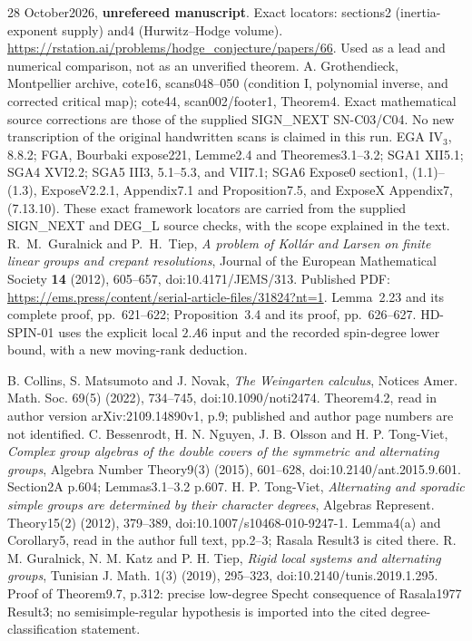28 October2026, \textbf{unrefereed manuscript}.
Exact locators: sections2 (inertia-exponent supply) and4
(Hurwitz--Hodge volume). \url{https://rstation.ai/problems/hodge_conjecture/papers/66}.
Used as a lead and numerical comparison, not as an unverified theorem.
A. Grothendieck, Montpellier archive, cote16, scans048--050
(condition I, polynomial inverse, and corrected critical map);
cote44, scan002/footer1, Theorem4. Exact mathematical source corrections
are those of the supplied SIGN\_NEXT SN-C03/C04. No new transcription
of the original handwritten scans is claimed in this run.
EGA IV$_3$, 8.8.2; FGA, Bourbaki expose221, Lemme2.4 and
Theoremes3.1--3.2; SGA1 XII5.1; SGA4 XVI2.2;
SGA5 III3, 5.1--5.3, and VII7.1;
SGA6 Expose0 section1, (1.1)--(1.3), ExposeV2.2.1,
Appendix7.1 and Proposition7.5, and ExposeX Appendix7, (7.13.10).
These exact framework locators are carried from the supplied
SIGN\_NEXT and DEG\_L source checks, with the scope explained in the text.
R.~M.~Guralnick and P.~H.~Tiep,
\emph{A problem of Koll\'ar and Larsen on finite linear groups
and crepant resolutions},
Journal of the European Mathematical Society \textbf{14}
(2012), 605--657, doi:10.4171/JEMS/313.
Published PDF: \url{https://ems.press/content/serial-article-files/31824?nt=1}.
Lemma~2.23 and its complete proof, pp.~621--622;
Proposition~3.4 and its proof, pp.~626--627.
HD-SPIN-01 uses the explicit local $2.A6$ input and the recorded
spin-degree lower bound, with a new moving-rank deduction.

 B. Collins, S. Matsumoto and J. Novak,
\emph{The Weingarten calculus}, Notices Amer. Math. Soc. 69(5)
(2022), 734--745, doi:10.1090/noti2474.
Theorem4.2, read in author version arXiv:2109.14890v1, p.9;
published and author page numbers are not identified.
 C. Bessenrodt, H. N. Nguyen, J. B. Olsson
and H. P. Tong-Viet, \emph{Complex group algebras of the double
covers of the symmetric and alternating groups}, Algebra Number
Theory9(3) (2015), 601--628, doi:10.2140/ant.2015.9.601.
Section2A p.604; Lemmas3.1--3.2 p.607.
 H. P. Tong-Viet, \emph{Alternating and
sporadic simple groups are determined by their character degrees},
Algebras Represent. Theory15(2) (2012), 379--389,
doi:10.1007/s10468-010-9247-1. Lemma4(a) and Corollary5,
read in the author full text, pp.2--3; Rasala Result3 is cited there.
 R. M. Guralnick, N. M. Katz and P. H. Tiep,
\emph{Rigid local systems and alternating groups}, Tunisian J. Math.
1(3) (2019), 295--323, doi:10.2140/tunis.2019.1.295.
Proof of Theorem9.7, p.312: precise low-degree Specht consequence
of Rasala1977 Result3; no semisimple-regular hypothesis is imported
into the cited degree-classification statement.
